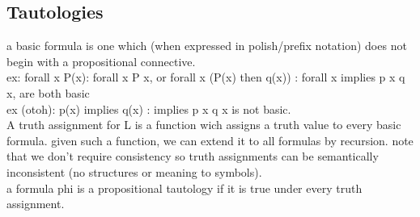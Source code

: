 \documentclass[11pt]{amsart}
\begin{document}
    \subsection{Tautologies}
    a basic formula is one which (when expressed in polish/prefix notation) does not begin with a propositional connective. \\
    ex: forall x P(x): forall x P x, or forall x (P(x) then q(x)) : forall x implies p x q x, are both basic\\
    ex (otoh): p(x) implies q(x) : implies p x q x is not basic.
    \\ A truth assignment for L is a function wich assigns a truth value to every basic formula.
    given such a function, we can extend it to all formulas by recursion.
    note that we don't require consistency so truth assignments can be semantically inconsistent (no structures or meaning to symbols).
    \\ a formula phi is a propositional tautology if it is true under every truth assignment.
\end{document}
